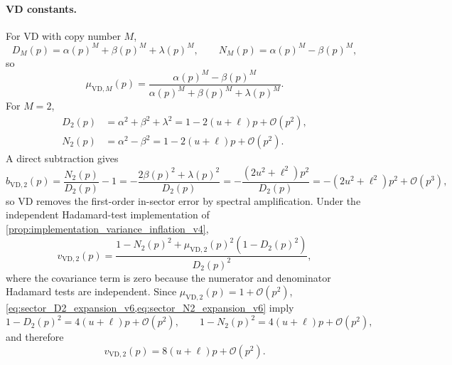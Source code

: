 \documentclass[11pt]{article}
\newcommand{\1}{\mathbf{1}}
\newcommand{\OO}{\mathcal{O}}
\begin{document}
\paragraph{VD constants.}
For VD with copy number \(M\),
\begin{equation}
    D_M(p)=\alpha(p)^M+\beta(p)^M+\lambda(p)^M,
    \qquad
    N_M(p)=\alpha(p)^M-\beta(p)^M,
\end{equation}
so
\begin{equation}
    \mu_{\mathrm{VD},M}(p)=\frac{\alpha(p)^M-\beta(p)^M}{\alpha(p)^M+\beta(p)^M+\lambda(p)^M}.
\end{equation}
For \(M=2\),
\begin{align}
    D_2(p)&=\alpha^2+\beta^2+\lambda^2
    =1-2(u+\ell)p+\OO(p^2),\label{eq:sector_D2_expansion_v6}\\
    N_2(p)&=\alpha^2-\beta^2
    =1-2(u+\ell)p+\OO(p^2).\label{eq:sector_N2_expansion_v6}
\end{align}
A direct subtraction gives
\begin{equation}
    b_{\mathrm{VD},2}(p)
    =\frac{N_2(p)}{D_2(p)}-1
    =-\frac{2\beta(p)^2+\lambda(p)^2}{D_2(p)}
    =-\frac{(2u^2+\ell^2)p^2}{D_2(p)}
    =-(2u^2+\ell^2)p^2+\OO(p^3),
    \label{eq:sector_toy_bvd2_v5}
\end{equation}
so VD removes the first-order in-sector error by spectral amplification.  Under the independent Hadamard-test implementation of \cref{prop:implementation_variance_inflation_v4},
\begin{equation}
    v_{\mathrm{VD},2}(p)
    =\frac{1-N_2(p)^2+\mu_{\mathrm{VD},2}(p)^2(1-D_2(p)^2)}{D_2(p)^2},
    \label{eq:sector_toy_vvd2_formula_v6}
\end{equation}
where the covariance term is zero because the numerator and denominator Hadamard tests are independent.  Since \(\mu_{\mathrm{VD},2}(p)=1+\OO(p^2)\), \cref{eq:sector_D2_expansion_v6,eq:sector_N2_expansion_v6} imply
\begin{equation}
    1-D_2(p)^2=4(u+\ell)p+\OO(p^2),
    \qquad
    1-N_2(p)^2=4(u+\ell)p+\OO(p^2),
\end{equation}
and therefore
\begin{equation}
    v_{\mathrm{VD},2}(p)
    =8(u+\ell)p+\OO(p^2).
    \label{eq:sector_toy_vvd2_v5}
\end{equation}
\end{document}

